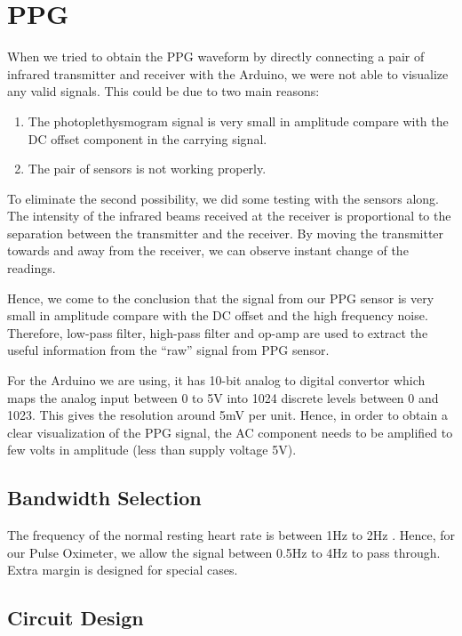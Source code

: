 \section{PPG}

When we tried to obtain the PPG waveform by directly connecting a pair of infrared transmitter and receiver with the Arduino, we were not able to visualize any valid signals. This could be due to two main reasons: 

\begin{enumerate}
	\item The photoplethysmogram signal is very small in amplitude compare with the DC offset component in the carrying signal.
	\item The pair of sensors is not working properly.	
\end{enumerate}

To eliminate the second possibility, we did some testing with the sensors along. The intensity of the infrared beams received at the receiver is proportional to the separation between the transmitter and the receiver. By moving the transmitter towards and away from the receiver, we can observe instant change of the readings. 

Hence, we come to the conclusion that the signal from our PPG sensor is very small in amplitude compare with the DC offset and the high frequency noise. Therefore, low-pass filter, high-pass filter and op-amp are used to extract the useful information from the “raw” signal from PPG sensor. 

For the Arduino we are using, it has 10-bit analog to digital convertor which maps the analog input between 0 to 5V into 1024 discrete levels between 0 and 1023. This gives the resolution around 5mV per unit. Hence, in order to obtain a clear visualization of the PPG signal, the AC component needs to be amplified to few volts in amplitude (less than supply voltage 5V). 

\subsection{Bandwidth Selection}

The frequency of the normal resting heart rate is between 1Hz to 2Hz \cite{george8}. Hence, for our Pulse Oximeter, we allow the signal between 0.5Hz to 4Hz to pass through. Extra margin is designed for special cases.

\subsection{Circuit Design}

